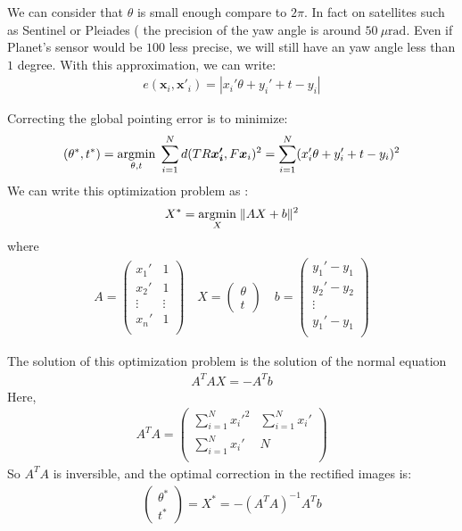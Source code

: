 \documentclass[paper=a4, fontsize=11pt, onecolumn, tikz, dvipsnames, svgnames, x11names]{article}
\begin{document}
We can consider that $\theta$ is small enough compare to $2\pi$. In fact on satellites such as Sentinel or Pleiades (%
the precision of the yaw angle is around $50~\mu \text{rad}$. Even if Planet's sensor would be $100$ less precise, we will still have an yaw angle less than $1$ degree.
With this approximation, we can write:
\begin{align*}
e(\textbf{x}_i, \textbf{x}'_i) = |x_i' \theta   + y_i' + t - y_i |
\end{align*}

Correcting the global pointing error is to minimize:
\begin{align*}
(\theta^*, t^*) = \underset{\theta,t}{\operatorname{argmin}}\; \sum_{i=1}^N d(TR\bm{x_i'}, F\bm{x}_i)^2 = \sum_{i=1}^N (x_i' \theta   + y_i' + t - y_i)^2
\end{align*}
We can write this optimization problem as :
\begin{align*}
X^* = \underset{X}{\operatorname{argmin}}\; \| AX + b \|^2
\end{align*}
where
\begin{align*}
A =
\begin{pmatrix}
x_1' & 1 \\
x_2' & 1 \\
\vdots & \vdots \\
x_n' & 1 \\
\end{pmatrix} \quad
X =
\begin{pmatrix}
\theta \\
t
\end{pmatrix} \quad
b =
\begin{pmatrix}
y_1' - y_1\\
y_2' - y_2\\
\vdots\\
y_1' - y_1\\
\end{pmatrix}
\end{align*}

The solution of this optimization problem is the solution of the normal equation
\begin{align*}
 A^TAX = -A^Tb
\end{align*}
Here,
\begin{align*}
A^TA =
\begin{pmatrix}
\sum\limits_{i=1}^N x_{i}'^2 & \sum\limits_{i=1}^Nx_{i}' \\
\sum\limits_{i=1}^N x_{i}' & N \\
\end{pmatrix}
\end{align*}
So $A^TA$ is inversible, and the optimal correction in the rectified images is:
\begin{align*}
\begin{pmatrix}
\theta^* \\
t^*
\end{pmatrix} = X^* = -(A^TA)^{-1}A^Tb
\end{align*}
\end{document}
